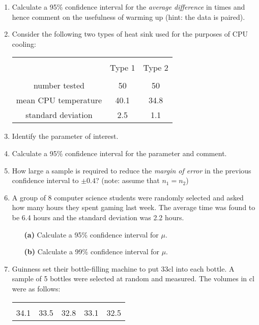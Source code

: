 \documentclass[]{report}
\begin{document}
\begin{enumerate}
\item Calculate a 95\% confidence interval for the \emph{average difference} in times and hence comment on the usefulness of warming up (hint: the data is paired).



\item 
Consider the following two types of heat sink used for the purposes of CPU cooling:\\[-0.4cm]
\begin{center}
\begin{tabular}{|c|c|c|}
\hline
&&\\[-0.3cm]
& Type 1 & Type 2 \\
\hline
&&\\[-0.3cm]
number tested      & 50 & 50 \\
mean CPU temperature   & 40.1  & 34.8 \\
standard deviation &  2.5 & 1.1 \\[0.1cm]
\hline
\end{tabular}
\end{center}

\item Identify the parameter of interest. 
 \item Calculate a 95\% confidence interval for the parameter and comment. 
 \item How large a sample is required to reduce the \emph{margin of error} in the previous confidence interval to $\pm 0.4$? (note: assume that $n_1 = n_2$)


\item
A group of 8 computer science students were randomly selected and asked how many hours they spent gaming last week. The average time was found to be 6.4 hours and the standard deviation was 2.2 hours.
\begin{itemize}
\item[{\bf(a)}] Calculate a 95\% confidence interval for $\mu$. \item[{\bf(b)}] Calculate a 99\% confidence interval for $\mu$.
\end{itemize}

\item 
Guinness set their bottle-filling machine to put 33cl into each bottle. A sample of 5 bottles were selected at random and measured. The volumes in cl were as follows:\\
\begin{center}
\begin{tabular}{|ccccc|}
\hline
&&&&\\[-0.3cm]
34.1  & 33.5 & 32.8 & 33.1 & 32.5\\[0.1cm]
\hline
\end{tabular}
\end{center}



\end{enumerate}
\end{document}
